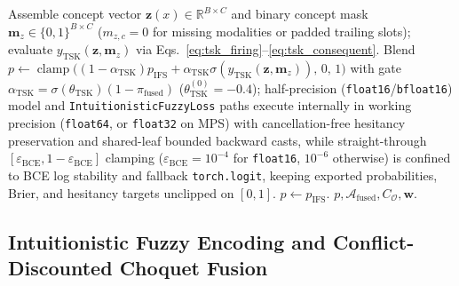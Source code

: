 \documentclass[10pt,twocolumn]{article}
\begin{document}
\begin{algorithm}[t]
\begin{algorithmic}[1]
    \State Assemble concept vector $\bm{z}(x) \in \mathbb{R}^{B \times C}$ and binary concept
    mask $\bm{m}_z \in \{0,1\}^{B \times C}$ ($m_{z,c}=0$ for missing modalities or padded
    trailing slots); evaluate $y_{\text{TSK}}(\bm{z}, \bm{m}_z)$ via
    Eqs.~\eqref{eq:tsk_firing}--\eqref{eq:tsk_consequent}.
    \State Blend $p \gets \operatorname{clamp}\big((1 - \alpha_{\text{TSK}})p_{\text{IFS}} +
    \alpha_{\text{TSK}}\sigma(y_{\text{TSK}}(\bm{z}, \bm{m}_z)),\, 0,\, 1\big)$ with gate
    $\alpha_{\text{TSK}} = \sigma(\theta_{\text{TSK}})(1 - \pi_{\text{fused}})$
    ($\theta_{\text{TSK}}^{(0)}=-0.4$); half-precision (\texttt{float16}/\texttt{bfloat16})
    model and \texttt{IntuitionisticFuzzyLoss} paths execute internally in working precision
    (\texttt{float64}, or \texttt{float32} on MPS) with cancellation-free hesitancy
    preservation and shared-leaf bounded backward casts, while straight-through
    $[\varepsilon_{\text{BCE}}, 1-\varepsilon_{\text{BCE}}]$ clamping
    ($\varepsilon_{\text{BCE}}=10^{-4}$ for \texttt{float16}, $10^{-6}$ otherwise) is confined
    to BCE log stability and fallback \texttt{torch.logit}, keeping exported probabilities,
    Brier, and hesitancy targets unclipped on $[0, 1]$.
\Else
    \State $p \gets p_{\text{IFS}}$.
\EndIf
\State \Return $p, \mathcal{A}_{\text{fused}}, C_{\mathcal{O}}, \bm{w}$.
\end{algorithmic}
\end{algorithm}

\subsection{Intuitionistic Fuzzy Encoding and Conflict-Discounted Choquet Fusion}
\end{document}
